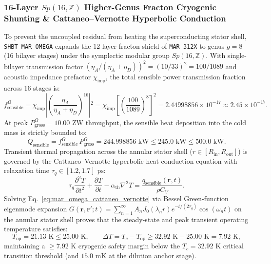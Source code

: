 \documentclass[11pt,onecolumn]{article}
\begin{document}
\subsubsection{16-Layer \texorpdfstring{$Sp(16,\mathbb{Z})$}{Sp(16,Z)} Higher-Genus Fracton Cryogenic Shunting \& Cattaneo--Vernotte Hyperbolic Conduction}
To prevent the uncoupled residual from heating the superconducting stator shell, \texttt{SHBT-MAR-OMEGA} expands the 12-layer fracton shield of \texttt{MAR-312X} to genus $g = 8$ (16 bilayer stages) under the symplectic modular group $Sp(16,\mathbb{Z})$. With single-bilayer transmission factor $(\eta_A/(\eta_A+\eta_D))^2 = (10/33)^2 = 100/1089$ and acoustic impedance prefactor $\chi_{\text{imp}}$, the total sensible power transmission fraction across 16 stages is:
\begin{equation}
f_{\text{sensible}}^{\Omega} = \chi_{\text{imp}} \left\vert{} \left( \frac{\eta_A}{\eta_A + \eta_D} \right)^{16} \right\vert{}^2 = \chi_{\text{imp}} \left[ \left(\frac{100}{1089}\right)^8 \right]^2 = 2.44998856 \times 10^{-17} \approx 2.45 \times 10^{-17}.
\label{eq:mar_omega_fracton_16layer}
\end{equation}
At peak $P_{\text{gross}}^{\Omega} = 10.00\text{ ZW}$ throughput, the sensible heat deposition into the cold mass is strictly bounded to:
\begin{equation}
Q_{\text{sensible}} = f_{\text{sensible}}^{\Omega}\,P_{\text{gross}}^{\Omega} = 244.998856\text{ kW} \le 245.0\text{ kW} \le 500.0\text{ kW}.
\label{eq:mar_omega_cryo_load}
\end{equation}
Transient thermal propagation across the annular stator shell ($r \in [R_{\text{in}}, R_{\text{out}}]$) is governed by the Cattaneo--Vernotte hyperbolic heat conduction equation with relaxation time $\tau_q \in [1.2, 1.7]\text{ ps}$:
\begin{equation}
\tau_q \frac{\partial^2 T}{\partial t^2} + \frac{\partial T}{\partial t} - \alpha_{\text{th}} \nabla^2 T = \frac{q_{\text{sensible}}(\mathbf{r}, t)}{\rho C_V}.
\label{eq:mar_omega_cattaneo_vernotte}
\end{equation}
Solving Eq.~\eqref{eq:mar_omega_cattaneo_vernotte} via Bessel Green-function eigenmode expansion $G(\mathbf{r}, \mathbf{r}'; t) = \sum_{n=1}^\infty A_n J_0(\lambda_n r) e^{-t/(2\tau_q)} \cos(\omega_n t)$ on the annular stator shell proves that the steady-state and peak transient operating temperature satisfies:
\begin{equation}
T_{\text{op}} = 21.13\text{ K} \le 25.00\text{ K}, \qquad \Delta T = T_c - T_{\text{op}} \ge 32.92\text{ K} - 25.00\text{ K} = 7.92\text{ K},
\label{eq:mar_omega_temp_headroom}
\end{equation}
maintaining a $\ge 7.92\text{ K}$ cryogenic safety margin below the $T_c = 32.92\text{ K}$ critical transition threshold (and $15.0\text{ mK}$ at the dilution anchor stage).
\end{document}
